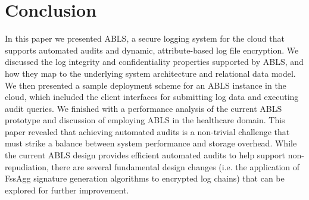 \documentclass{sig-alternate}
\begin{document}
\section{Conclusion}
In this paper we presented ABLS, a secure logging system for the cloud that supports automated audits and dynamic,
attribute-based log file encryption. We discussed the log integrity and confidentiality properties supported by ABLS, 
and how they map to the underlying system architecture and relational data model. We then presented a sample deployment 
scheme for an ABLS instance in the cloud, which included the client interfaces for submitting log data and executing 
audit queries. We finished with a performance analysis of the current ABLS prototype and discussion of employing ABLS in 
the healthcare domain. This paper revealed that achieving automated audits is a non-trivial challenge that must strike
a balance between system performance and storage overhead. While the current ABLS design provides efficient automated
audits to help support non-repudiation, there are several fundamental design changes (i.e. the application of FssAgg 
signature generation algorithms to encrypted log chains) that can be explored for further improvement.

\balance
\end{document}
